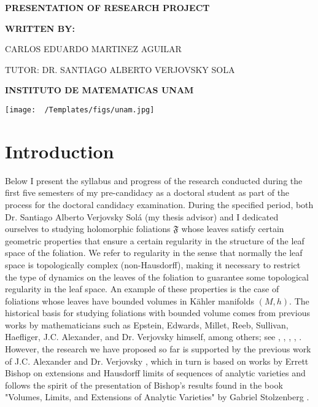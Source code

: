 \documentclass{article}
\begin{document}
\begin{titlepage}
\begin{center}

\Large\textbf{PRESENTATION OF RESEARCH PROJECT}
\vspace*{2cm}

\small\textbf{WRITTEN BY:}
\vspace*{2cm}

\small CARLOS EDUARDO MARTINEZ AGUILAR
\vspace*{2cm}

\small TUTOR: DR. SANTIAGO ALBERTO VERJOVSKY SOLA
\vspace*{0.5cm}

\small \textbf{INSTITUTO DE MATEMATICAS UNAM}
\vspace*{2.5cm}

\texttt{[image: ~/Templates/figs/unam.jpg]} %
\end{center}

\end{titlepage}

\tableofcontents
\clearpage

\section{Introduction}
\noindent Below I present the syllabus and progress of the research conducted during the first five semesters
of my pre-candidacy as a doctoral student as part of the process for the doctoral candidacy examination.
During the specified period, both Dr. Santiago Alberto Verjovsky Solá (my thesis advisor) and I dedicated ourselves to studying
holomorphic foliations $\mathfrak{F}$ whose leaves satisfy certain geometric properties that ensure a certain regularity in
the structure of the leaf space of the foliation. We refer to regularity in the sense that normally the
leaf space is topologically complex (non-Hausdorff), making it necessary to restrict the type of dynamics on the leaves
of the foliation to guarantee some topological regularity in the leaf space. An example of these properties is the case of foliations whose leaves have
bounded volumes in K\"ahler manifolds $(M,h)$.
The historical basis for studying foliations with bounded volume comes from previous works by mathematicians such as
Epstein, Edwards, Millet, Reeb, Sullivan, Haefliger, J.C. Alexander, and Dr. Verjovsky himself, among others; see \cite{EMS}, \cite{V-A}, \cite{E-V}, \cite{Epstein1}, \cite{Epstein2}.
However, the research we have proposed so far is supported by the previous work of J.C. Alexander and
Dr. Verjovsky \cite{A-V}, which in turn is based on works by Errett Bishop \cite{Bishop} on extensions and Hausdorff limits
of sequences of analytic varieties and follows the spirit of the presentation of Bishop's results found in the
book "Volumes, Limits, and Extensions of Analytic Varieties" by Gabriel Stolzenberg \cite{Stolzenberg}.
\end{document}
